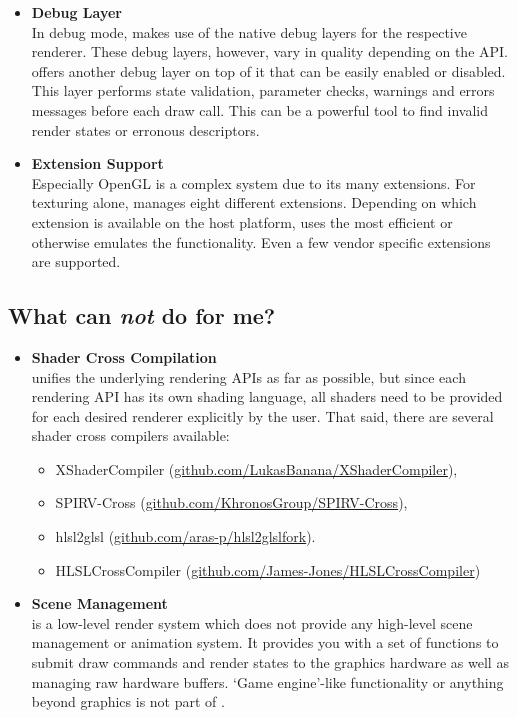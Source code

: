 \documentclass{article}
\begin{document}
\begin{itemize}
	\item \textbf{Debug Layer} \\
	In debug mode, \LLGL makes use of the native debug layers for the respective renderer.
	These debug layers, however, vary in quality depending on the API.
	\LLGL offers another debug layer on top of it that can be easily enabled or disabled.
	This layer performs state validation, parameter checks, warnings and errors messages before each draw call.
	This can be a powerful tool to find invalid render states or erronous descriptors.
	
	\item \textbf{Extension Support} \\
	Especially OpenGL is a complex system due to its many extensions.
	For texturing alone, \LLGL manages eight different extensions.
	Depending on which extension is available on the host platform, \LLGL uses the most efficient or otherwise emulates the functionality.
	Even a few vendor specific extensions are supported.
\end{itemize}


\subsection{What can \LLGL \emph{not} do for me?}

\begin{itemize}
	\item \textbf{Shader Cross Compilation} \\
	\LLGL unifies the underlying rendering APIs as far as possible, but since each rendering API has its own shading language,
	all shaders need to be provided for each desired renderer explicitly by the user.
	That said, there are several shader cross compilers available:
	\begin{itemize}
	\item XShaderCompiler (\href{https://github.com/LukasBanana/XShaderCompiler}{github.com/LukasBanana/XShaderCompiler}),
	\item SPIRV-Cross (\href{https://github.com/KhronosGroup/SPIRV-Cross}{github.com/KhronosGroup/SPIRV-Cross}),
	\item hlsl2glsl (\href{https://github.com/aras-p/hlsl2glslfork}{github.com/aras-p/hlsl2glslfork}).
	\item HLSLCrossCompiler (\href{https://github.com/James-Jones/HLSLCrossCompiler}{github.com/James-Jones/HLSLCrossCompiler})
	\end{itemize}
	
	\item \textbf{Scene Management} \\
	\LLGL is a low-level render system which does not provide any high-level scene management or animation system.
	It provides you with a set of functions to submit draw commands and render states to the graphics hardware as well as managing raw hardware buffers.
	`Game engine'-like functionality or anything beyond graphics is not part of \LLGL.
\end{itemize}
\end{document}
